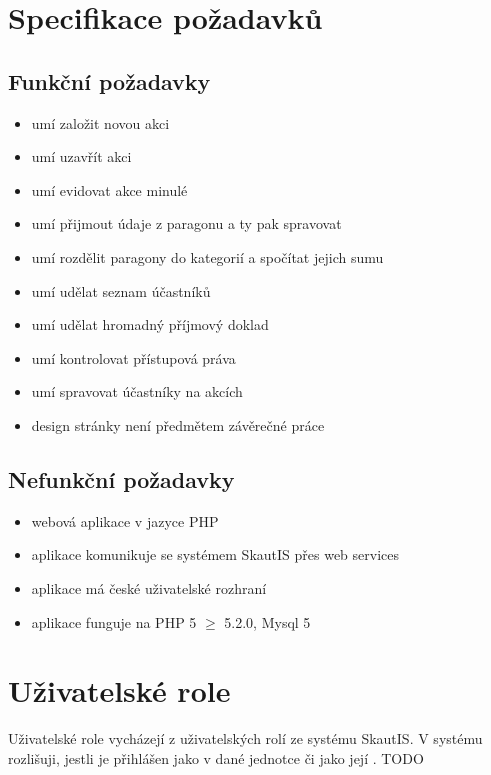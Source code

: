 \documentclass[thesis=B,czech]{FITthesis}[2011/06/14]
\begin{document}
\section{Specifikace požadavků}
\subsection{Funkční požadavky}
\begin{itemize}
	\item umí založit novou akci
	\item umí uzavřít akci
	\item umí evidovat akce minulé
	\item umí přijmout údaje z paragonu a ty pak spravovat
	\item umí rozdělit paragony do kategorií a spočítat jejich sumu
	\item umí udělat seznam účastníků
	\item umí udělat hromadný příjmový doklad
	\item umí kontrolovat přístupová práva
	\item umí spravovat účastníky na akcích
	\item design stránky není předmětem závěrečné práce
\end{itemize}

\subsection{Nefunkční požadavky}
\begin{itemize}
	\item webová aplikace v jazyce PHP
	\item aplikace komunikuje se systémem SkautIS přes web services
	\item aplikace má české uživatelské rozhraní
	\item aplikace funguje na PHP 5 $\geq$ 5.2.0, Mysql 5
\end{itemize}

\section{Uživatelské role}
Uživatelské role vycházejí z uživatelských rolí ze systému SkautIS. V systému rozlišuji, jestli je přihlášen jako  v dané jednotce či jako její .
TODO
\end{document}
